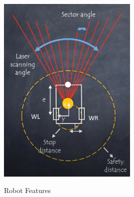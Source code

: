 \begin{figure}[H]
  \centering
  \includegraphics[width= 0.6\textwidth]{Figures/robot features.PNG}
  \caption[Robot Features]{Robot Features}
   \label{fig:Robot Features} \cite{PF}
\end{figure}

